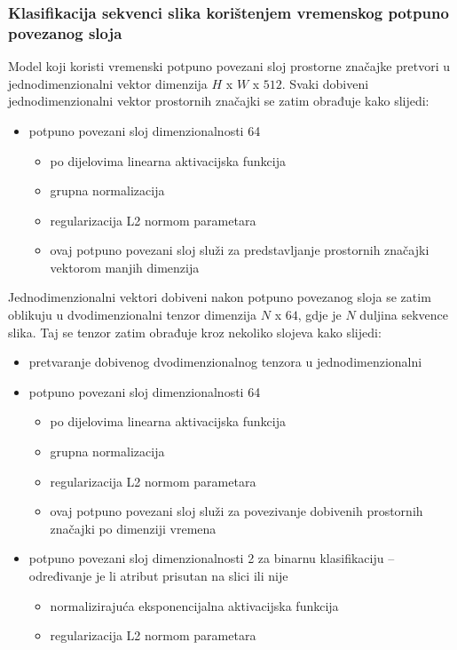 \documentclass[times, utf8, diplomski, numeric]{fer}
\begin{document}
\subsubsection{Klasifikacija sekvenci slika korištenjem vremenskog potpuno povezanog sloja}
Model koji koristi vremenski potpuno povezani sloj prostorne značajke pretvori u jednodimenzionalni vektor dimenzija $H$ x $W$ x $512$.
Svaki dobiveni jednodimenzionalni vektor prostornih značajki se zatim obrađuje kako slijedi:
\begin{itemize}
  \item potpuno povezani sloj dimenzionalnosti 64
 \begin{itemize}
  \item po dijelovima linearna  aktivacijska funkcija
  \item grupna normalizacija 
  \item regularizacija L2 normom parametara
  \item ovaj potpuno povezani sloj služi za predstavljanje prostornih značajki vektorom manjih dimenzija
 \end{itemize}
\end{itemize}
Jednodimenzionalni vektori dobiveni nakon potpuno povezanog sloja se zatim oblikuju u dvodimenzionalni tenzor dimenzija $N$ x $64$, gdje je $N$ duljina sekvence slika.
Taj se tenzor zatim obrađuje kroz nekoliko slojeva kako slijedi:
\begin{itemize}
 \item pretvaranje dobivenog dvodimenzionalnog tenzora u jednodimenzionalni
 \item potpuno povezani sloj dimenzionalnosti 64
 \begin{itemize}
  \item po dijelovima linearna  aktivacijska funkcija
  \item grupna normalizacija 
  \item regularizacija L2 normom parametara
  \item ovaj potpuno povezani sloj služi za povezivanje dobivenih prostornih značajki po dimenziji vremena
 \end{itemize}
 \item potpuno povezani sloj dimenzionalnosti 2 za binarnu klasifikaciju -- određivanje je li atribut prisutan na slici ili nije
 \begin{itemize}
  \item normalizirajuća eksponencijalna  aktivacijska funkcija
  \item regularizacija L2 normom parametara
 \end{itemize}
\end{itemize}
\end{document}
